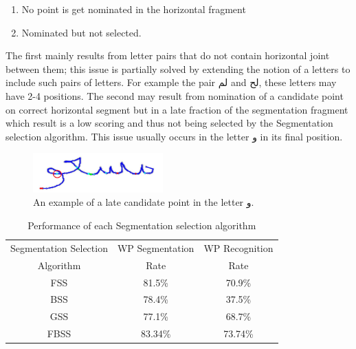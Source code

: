 \documentclass[journal,compsoc]{IEEEtran}
\begin{document}
\begin{enumerate}
\item No point is get nominated in the horizontal fragment
\item Nominated but not selected.
\end{enumerate}

The first mainly results from letter pairs that do not contain horizontal joint between them; this issue is partially solved by extending the notion of a letters to include such pairs of letters. For example the pair لم and لح, these letters may have 2-4 positions. The second may result from nomination of a candidate point on correct horizontal segment but in a late fraction of the segmentation fragment which result is a low scoring and thus not being selected by the Segmentation selection algorithm. This issue usually occurs in the letter و in its final position.

\begin{figure}[h]
\centering
\includegraphics[width=5cm]{./figures/undersegmentation_w}
\caption{An example of a late candidate point in the letter و.}
\label{fig:undersegmentation_w}
\end{figure}


\begin{table}[h]
\caption{Performance of each Segmentation selection algorithm}
\begin{tabular}{ | c | c | c | }
\hline
Segmentation Selection & WP Segmentation & WP Recognition \\
Algorithm & Rate & Rate \\
\hline                 
  FSS & 81.5\% & 70.9\% \\ 
  \hline
  BSS & 78.4\% &  37.5\% \\ 
 \hline
 GSS & 77.1\% & 68.7\% \\ 
 \hline
  FBSS & 83.34\% & 73.74\% \\
\hline
\end{tabular}
\centering
\label{table:ss_algorithms_results} 
\end{table}
\end{document}
